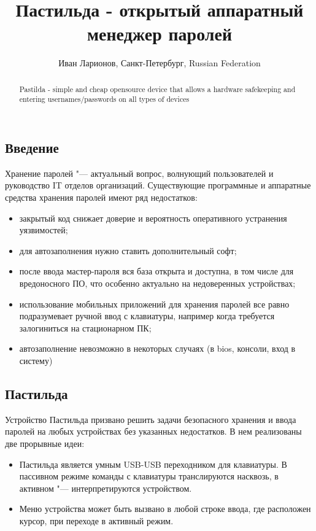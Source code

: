 \documentclass[10pt, a5paper]{article}
\begin{document}
\title{Пастильда - открытый аппаратный менеджер паролей}
\author{Иван Ларионов, Санкт-Петербург, Russian Federation}
\maketitle
\begin{abstract}
Pastilda - simple and cheap opensource device that allows a hardware safekeeping and entering usernames/passwords on all types of devices
\end{abstract}
\subsection*{Введение}

Хранение паролей "--- актуальный вопрос, волнующий пользователей и руководство IT отделов организаций. Существующие программные и аппаратные средства хранения паролей имеют ряд недостатков:

\begin{itemize}
  \item закрытый код снижает доверие и вероятность оперативного устранения уязвимостей;
  \item для автозаполнения нужно ставить дополнительный софт;
  \item после ввода мастер-пароля вся база открыта и доступна, в том числе для вредоносного ПО, что особенно актуально на недоверенных устройствах;
  \item использование мобильных приложений для хранения паролей все равно подразумевает ручной ввод с клавиатуры, например когда требуется залогиниться на стационарном ПК;
  \item автозаполнение невозможно в некоторых случаях (в bios, консоли, вход в систему)
\end{itemize}

\subsection*{Пастильда}

Устройство Пастильда призвано решить задачи безопасного хранения и ввода паролей на любых устройствах без указанных недостатков. В нем реализованы две прорывные идеи:

\begin{itemize}
  \item Пастильда является умным USB-USB переходником для клавиатуры. В пассивном режиме команды с клавиатуры транслируются насквозь, в активном "--- интерпретируются устройством.
  \item Меню устройства может быть вызвано в любой строке ввода, где расположен курсор, при переходе в активный режим.
\end{itemize}
\end{document}
